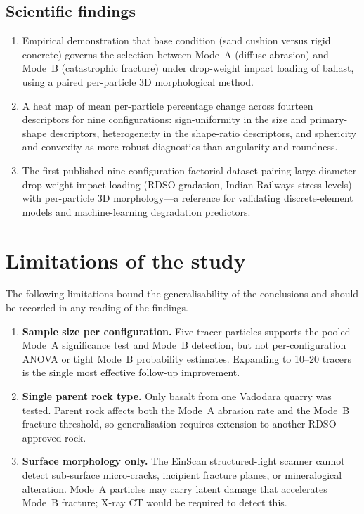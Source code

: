 \subsection{Scientific findings}
\label{sec:contrib-science}

\begin{enumerate}[label=(\alph*),leftmargin=2.2em]
  \item Empirical demonstration that base condition (sand cushion versus rigid concrete) governs the selection between Mode~A (diffuse abrasion) and Mode~B (catastrophic fracture) under drop-weight impact loading of ballast, using a paired per-particle 3D morphological method.
  \item A heat map of mean per-particle percentage change across fourteen descriptors for nine configurations: sign-uniformity in the size and primary-shape descriptors, heterogeneity in the shape-ratio descriptors, and sphericity and convexity as more robust diagnostics than angularity and roundness.
  \item The first published nine-configuration factorial dataset pairing large-diameter drop-weight impact loading (RDSO gradation, Indian Railways stress levels) with per-particle 3D morphology---a reference for validating discrete-element models and machine-learning degradation predictors.
\end{enumerate}

\section{Limitations of the study}
\label{sec:limitations}

The following limitations bound the generalisability of the conclusions and should be recorded in any reading of the findings.
\begin{enumerate}[label=\arabic*.,leftmargin=2.2em]
  \item \textbf{Sample size per configuration.} Five tracer particles supports the pooled Mode~A significance test and Mode~B detection, but not per-configuration ANOVA or tight Mode~B probability estimates. Expanding to 10--20 tracers is the single most effective follow-up improvement.
  \item \textbf{Single parent rock type.} Only basalt from one Vadodara quarry was tested. Parent rock affects both the Mode~A abrasion rate and the Mode~B fracture threshold, so generalisation requires extension to another RDSO-approved rock.
  \item \textbf{Surface morphology only.} The EinScan structured-light scanner cannot detect sub-surface micro-cracks, incipient fracture planes, or mineralogical alteration. Mode~A particles may carry latent damage that accelerates Mode~B fracture; X-ray CT would be required to detect this.
\end{enumerate}

